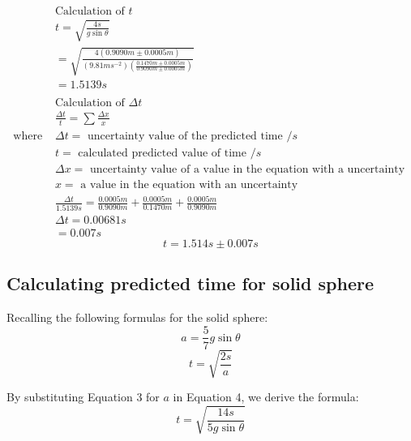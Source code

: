 \documentclass[letterpaper, 12pt]{article}
\begin{document}
\begin{align*}
                  & \text{Calculation of } t
    \\
                  & t = \sqrt{\frac{4s}{g\sin\theta}}
    \\
                  & = \sqrt{\frac{4(0.9090\unit{m} \pm 0.0005\unit{m})}{(9.81\unit{ms^{-2}})(\frac{0.1470\unit{m} \pm 0.0005\unit{m}}{0.9090\unit{m} \pm 0.0005\unit{m}})}}
    \\
                  & = 1.5139\unit{s}
    \\
    \\
                  & \text{Calculation of } \Delta t
    \\
                  & \frac{\Delta t}{t} = \sum \frac{\Delta x}{x}
    \\
    \text{where } & \Delta t = \text{ uncertainty value of the predicted time } /\unit{s}
    \\
                  & t = \text{ calculated predicted value of time } /\unit{s}
    \\
                  & \Delta x = \text{ uncertainty value of a value in the equation with a uncertainty }
    \\
                  & x = \text{ a value in the equation with an uncertainty }
    \\
                  & \frac{\Delta t}{1.5139\unit{s}} = \frac{0.0005\unit{m}}{0.9090\unit{m}} + \frac{0.0005\unit{m}}{0.1470\unit{m}} + \frac{0.0005\unit{m}}{0.9090\unit{m}}
    \\
                  & \Delta t = 0.00681\unit{s}
    \\
                  & = 0.007\unit{s}
\end{align*}
$$
    t = 1.514\unit{s} \pm 0.007\unit{s}
$$

\subsection{Calculating predicted time for solid sphere}

Recalling the following formulas for the solid sphere:
\begin{equation}
    a = \frac{5}{7}g\sin\theta
\end{equation}
\begin{equation}
    t = \sqrt{\frac{2s}{a}}
\end{equation}

By substituting Equation 3 for $a$ in Equation 4, we derive the formula:
$$
    t = \sqrt{\frac{14s}{5g\sin\theta}}
$$
\end{document}
